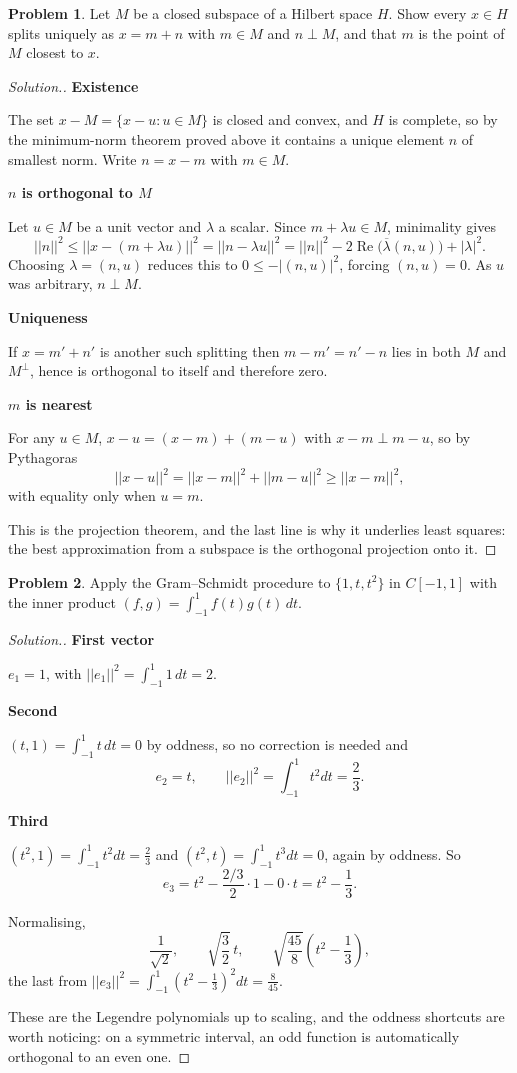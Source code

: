 \documentclass[11pt,a4paper]{article}
\theoremstyle{definition}
\newtheorem{problemx}{Problem}[section]
\newenvironment{problem}{\begin{problemx}}{\end{problemx}}
\newenvironment{solution}
  {\renewcommand{\qedsymbol}{}\begin{proof}[\textit{Solution}.]}
  {\end{proof}}
\newcommand{\subhead}[1]{%
  \par\medskip\noindent\textbf{#1}\par\nobreak\smallskip}
\begin{document}
\begin{problem}
Let $M$ be a closed subspace of a Hilbert space $H$. Show every $x\in H$ splits
uniquely as $x=m+n$ with $m\in M$ and $n\perp M$, and that $m$ is the point of
$M$ closest to $x$.
\end{problem}
\begin{solution}
\subhead{Existence}
The set $x-M=\{x-u:u\in M\}$ is closed and convex, and $H$ is complete, so by
the minimum-norm theorem proved above it contains a unique element $n$ of
smallest norm. Write $n=x-m$ with $m\in M$.

\subhead{$n$ is orthogonal to $M$}
Let $u\in M$ be a unit vector and $\lambda$ a scalar. Since $m+\lambda u\in M$,
minimality gives
$$||n||^2\leq ||x-(m+\lambda u)||^2=||n-\lambda u||^2
=||n||^2-2\operatorname{Re}\big(\overline{\lambda}(n,u)\big)+|\lambda|^2 .$$
Choosing $\lambda=(n,u)$ reduces this to $0\leq -|(n,u)|^2$, forcing
$(n,u)=0$. As $u$ was arbitrary, $n\perp M$.

\subhead{Uniqueness}
If $x=m'+n'$ is another such splitting then $m-m'=n'-n$ lies in both $M$ and
$M^{\perp}$, hence is orthogonal to itself and therefore zero.

\subhead{$m$ is nearest}
For any $u\in M$, $x-u=(x-m)+(m-u)$ with $x-m\perp m-u$, so by Pythagoras
$$||x-u||^2=||x-m||^2+||m-u||^2\geq ||x-m||^2 ,$$
with equality only when $u=m$.

This is the projection theorem, and the last line is why it underlies least
squares: the best approximation from a subspace is the orthogonal projection
onto it.
\end{solution}

\begin{problem}
Apply the Gram--Schmidt procedure to $\{1,t,t^2\}$ in $C[-1,1]$ with the inner
product $(f,g)=\int_{-1}^{1}f(t)g(t)\,dt$.
\end{problem}
\begin{solution}
\subhead{First vector}
$e_1=1$, with $||e_1||^2=\int_{-1}^{1}1\,dt=2$.

\subhead{Second}
$(t,1)=\int_{-1}^{1}t\,dt=0$ by oddness, so no correction is needed and
$$e_2=t,\qquad ||e_2||^2=\int_{-1}^{1}t^2dt=\frac{2}{3}.$$

\subhead{Third}
$(t^2,1)=\int_{-1}^{1}t^2dt=\frac23$ and $(t^2,t)=\int_{-1}^{1}t^3dt=0$, again
by oddness. So
$$e_3=t^2-\frac{2/3}{2}\cdot 1-0\cdot t=t^2-\frac13 .$$

Normalising,
$$\frac{1}{\sqrt2},\qquad \sqrt{\frac32}\,t,\qquad
\sqrt{\frac{45}{8}}\left(t^2-\frac13\right),$$
the last from $||e_3||^2=\int_{-1}^{1}\left(t^2-\frac13\right)^2dt=\frac{8}{45}$.

These are the Legendre polynomials up to scaling, and the oddness shortcuts are
worth noticing: on a symmetric interval, an odd function is automatically
orthogonal to an even one.
\end{solution}
\end{document}
